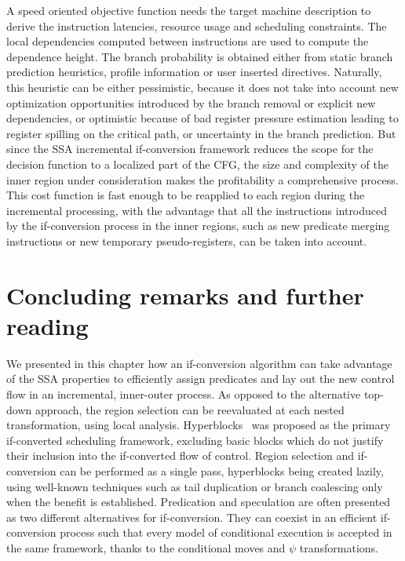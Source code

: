 A speed oriented objective function needs the target machine description to derive the instruction latencies, resource usage and scheduling constraints. 
The local dependencies computed between instructions are used to compute the dependence height. 
The branch probability is obtained either from static branch prediction heuristics, profile information or user inserted directives. 
Naturally, this heuristic can be either pessimistic, because it does not take into account new optimization opportunities introduced by the branch removal or explicit new dependencies, or optimistic because of bad register pressure estimation leading to register spilling on the critical path, or uncertainty in the branch prediction. 
But since the SSA incremental if-conversion framework reduces the scope for the decision function to a localized part of the CFG, the size and complexity of the inner region under consideration makes the profitability a comprehensive process. 
This cost function is fast enough to be reapplied to each region during the incremental processing, with the advantage that all the instructions introduced by the if-conversion process in the inner regions, such as new predicate merging instructions or new temporary pseudo-registers, can be taken into account.

\section{Concluding remarks and further reading} 
We presented in this chapter how an if-conversion algorithm can take advantage of the SSA properties to efficiently assign predicates and lay out the new control flow in an incremental, inner-outer process. 
As opposed to the alternative top-down approach, the region selection can be reevaluated at each nested transformation, using local analysis. 
Hyperblocks~\cite{Mahlke:1992:ECS:144965.144998} was proposed as the primary if-converted scheduling framework, excluding basic blocks which do not justify their inclusion into the if-converted flow of control.
Region selection and if-conversion can be performed as a single pass, hyperblocks being created lazily, using well-known techniques such as tail duplication or branch coalescing only when the benefit is established. 
Predication and speculation are often presented as two different alternatives for if-conversion. They can coexist in an efficient if-conversion process such that every model of conditional execution is accepted in the same framework, thanks to the conditional moves and $\psi$ \cite{Stoutchinin:2001:MICRO} transformations.















